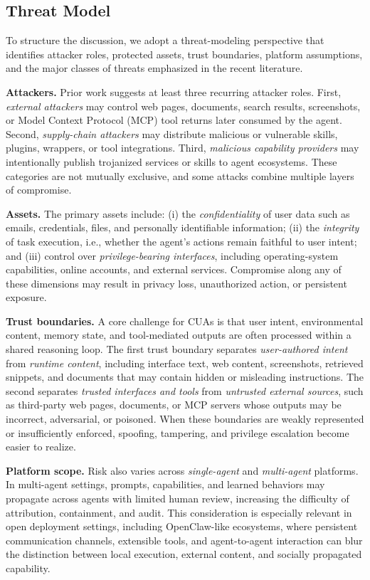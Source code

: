 \subsection{Threat Model}
\label{subsec:threat_model}

To structure the discussion, we adopt a threat-modeling perspective that identifies attacker roles, protected assets, trust boundaries, platform assumptions, and the major classes of threats emphasized in the recent literature.

\textbf{Attackers.} Prior work suggests at least three recurring attacker roles. First, \emph{external attackers} may control web pages, documents, search results, screenshots, or Model Context Protocol (MCP) tool returns later consumed by the agent. Second, \emph{supply-chain attackers} may distribute malicious or vulnerable skills, plugins, wrappers, or tool integrations. Third, \emph{malicious capability providers} may intentionally publish trojanized services or skills to agent ecosystems. These categories are not mutually exclusive, and some attacks combine multiple layers of compromise.

\textbf{Assets.} The primary assets include: (i) the \emph{confidentiality} of user data such as emails, credentials, files, and personally identifiable information; (ii) the \emph{integrity} of task execution, i.e., whether the agent’s actions remain faithful to user intent; and (iii) control over \emph{privilege-bearing interfaces}, including operating-system capabilities, online accounts, and external services. Compromise along any of these dimensions may result in privacy loss, unauthorized action, or persistent exposure.

\textbf{Trust boundaries.} A core challenge for CUAs is that user intent, environmental content, memory state, and tool-mediated outputs are often processed within a shared reasoning loop. The first trust boundary separates \emph{user-authored intent} from \emph{runtime content}, including interface text, web content, screenshots, retrieved snippets, and documents that may contain hidden or misleading instructions. The second separates \emph{trusted interfaces and tools} from \emph{untrusted external sources}, such as third-party web pages, documents, or MCP servers whose outputs may be incorrect, adversarial, or poisoned. When these boundaries are weakly represented or insufficiently enforced, spoofing, tampering, and privilege escalation become easier to realize.

\textbf{Platform scope.} Risk also varies across \emph{single-agent} and \emph{multi-agent} platforms. In multi-agent settings, prompts, capabilities, and learned behaviors may propagate across agents with limited human review, increasing the difficulty of attribution, containment, and audit. This consideration is especially relevant in open deployment settings, including OpenClaw-like ecosystems, where persistent communication channels, extensible tools, and agent-to-agent interaction can blur the distinction between local execution, external content, and socially propagated capability.

